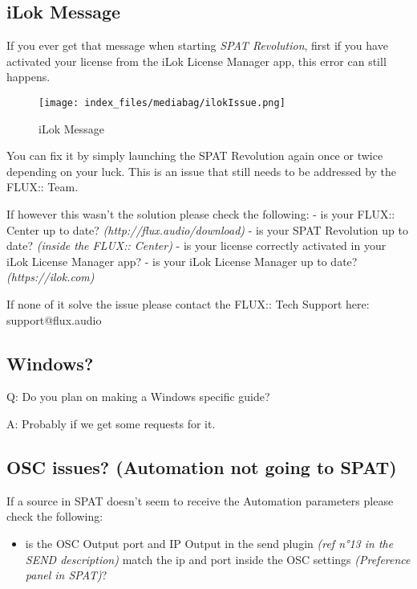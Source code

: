 \documentclass[
  letterpaper,
  DIV=11,
  numbers=noendperiod]{scrreport}
\providecommand{\tightlist}{%
  \setlength{\itemsep}{0pt}\setlength{\parskip}{0pt}}\usepackage{longtable,booktabs,array}
\begin{document}
\hypertarget{ilok-message}{%
\subsection{iLok Message}\label{ilok-message}}

If you ever get that message when starting \emph{SPAT Revolution}, first
if you have activated your license from the iLok License Manager app,
this error can still happens.

\begin{figure}

{\centering \texttt{[image: index\_files/mediabag/ilokIssue.png]}

}

\caption{iLok Message}

\end{figure}

You can fix it by simply launching the SPAT Revolution again once or
twice depending on your luck. This is an issue that still needs to be
addressed by the FLUX:: Team.

If however this wasn't the solution please check the following: - is
your FLUX:: Center up to date? \emph{(http://flux.audio/download)} - is
your SPAT Revolution up to date? \emph{(inside the FLUX:: Center)} - is
your license correctly activated in your iLok License Manager app? - is
your iLok License Manager up to date? \emph{(https://ilok.com)}

If none of it solve the issue please contact the FLUX:: Tech Support
here: support@flux.audio

\hypertarget{windows-1}{%
\subsection{Windows?}\label{windows-1}}

Q: Do you plan on making a Windows specific guide?

A: Probably if we get some requests for it.

\hypertarget{osc-issues-automation-not-going-to-spat}{%
\subsection{OSC issues? (Automation not going to
SPAT)}\label{osc-issues-automation-not-going-to-spat}}

If a source in SPAT doesn't seem to receive the Automation parameters
please check the following:

\begin{itemize}
\tightlist
\item
  is the OSC Output port and IP Output in the send plugin \emph{(ref
  n°13 in the SEND description)} match the ip and port inside the OSC
  settings \emph{(Preference panel in SPAT)}?
\end{itemize}
\end{document}
